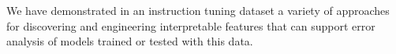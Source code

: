 


We have demonstrated in an instruction tuning dataset a variety of approaches for discovering and engineering interpretable features that can support error analysis of models trained or tested with this data.







